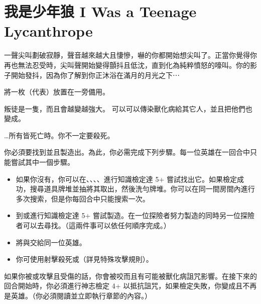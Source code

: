 
\chapter{我是少年狼 I Was a Teenage Lycanthrope}

\begin{HauntStory}
  一聲尖叫劃破寂靜，聲音越來越大且悽慘，嚇的你都開始想尖叫了。正當你覺得你再也無法忍受時，尖叫聲開始變得顫抖且低沈，直到化為純粹憤怒的嚎叫。你的影子開始發抖，因為你了解到你正沐浴在滿月的月光之下⋯
\end{HauntStory}

將一枚（代表）放置在一旁備用。


叛徒是一隻，而且會越變越強大。
可以可以傳染獸化病給其它人，並且把他們也變成。

…所有皆死亡時。你不一定要殺死。

你必須要找到並且製造出。為此，你必需完成下列步驟。每一位英雄在一回合中只能嘗試其中一個步驟。
\begin{itemize}
  \item 如果你沒有，你可以在、、、、進行知識檢定達 5+ 嘗試找出它。如果檢定成功，搜尋道具牌堆並抽將其取出，然後洗勻牌堆。你可以在同一間房間內進行多次搜索，但是你每回合中只能搜索一次。
  \item 到或進行知識檢定達 5+ 嘗試製造。在一位探險者努力製造的同時另一位探險者可以去尋找。（這兩件事可以依任何順序完成。）
  \item 將與交給同一位英雄。
  \item 你可使用射擊殺死或（詳見特殊攻擊規則）。
\end{itemize}

\vfill\null\pagebreak

如果你被或攻擊且受傷的話，你會被咬而且有可能被獸化病詛咒影響。在接下來的回合開始時，你必須進行神志檢定 4+ 以抵抗詛咒，如果檢定失敗，你變成且不再是英雄。（你必須閱讀並立即執行章節的內容。）

